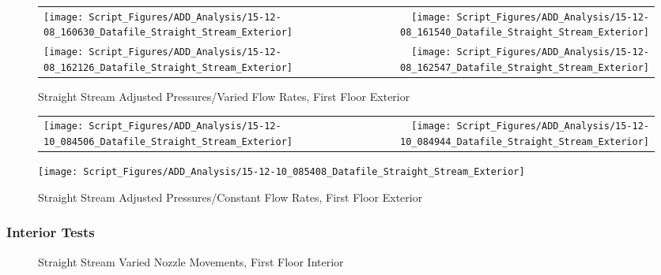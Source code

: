 \documentclass{article}
\begin{document}
\begin{appendices}
\begin{figure}[ht]
\begin{tabular*}{\textwidth}{lr}
\texttt{[image: Script\_Figures/ADD\_Analysis/15-12-08\_160630\_Datafile\_Straight\_Stream\_Exterior]} &
\texttt{[image: Script\_Figures/ADD\_Analysis/15-12-08\_161540\_Datafile\_Straight\_Stream\_Exterior]} \\
\texttt{[image: Script\_Figures/ADD\_Analysis/15-12-08\_162126\_Datafile\_Straight\_Stream\_Exterior]} &
\texttt{[image: Script\_Figures/ADD\_Analysis/15-12-08\_162547\_Datafile\_Straight\_Stream\_Exterior]} \\
\end{tabular*}
\caption{Straight Stream Adjusted Pressures/Varied Flow Rates, First Floor Exterior}
\label{fig:Straight Stream Adjusted Pressures/Varied Flow Rates, First Floor Exterior}
\end{figure}

\clearpage

\begin{figure}[ht]
\begin{tabular*}{\textwidth}{lr}
\texttt{[image: Script\_Figures/ADD\_Analysis/15-12-10\_084506\_Datafile\_Straight\_Stream\_Exterior]} &
\texttt{[image: Script\_Figures/ADD\_Analysis/15-12-10\_084944\_Datafile\_Straight\_Stream\_Exterior]} \\
\end{tabular*}
\centering
\texttt{[image: Script\_Figures/ADD\_Analysis/15-12-10\_085408\_Datafile\_Straight\_Stream\_Exterior]}
\caption{Straight Stream Adjusted Pressures/Constant Flow Rates, First Floor Exterior}
\label{fig:Straight Stream Adjusted Pressures/Constant Flow Rates, First Floor Exterior}
\end{figure}

\clearpage

\subsubsection{Interior Tests}

\begin{figure}[ht]
\centering
{}
\caption{Straight Stream Varied Nozzle Movements, First Floor Interior}
\label{fig:Straight Stream Varied Nozzle Movements, First Floor Interior}
\end{figure}


\end{appendices}
\end{document}
